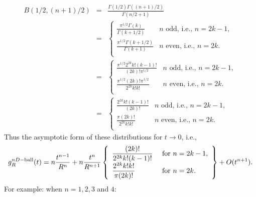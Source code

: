 \begin{eqnarray}
  \label{eq:beta_specified_vals}
  B(1/2,(n+1)/2) & = & \frac{\Gamma(1/2) \Gamma((n+1)/2)}{\Gamma(n/2 + 1)} \nonumber \\
  & = & \left\{ \begin{array}{ll}
      \displaystyle \frac{\pi^{1/2} \Gamma(k)}{\Gamma(k+1/2)} & n \mbox{ odd, i.e., } n=2k-1,\\
      \displaystyle \frac{\pi^{1/2} \Gamma(k+ 1/2)}{\Gamma(k + 1)} & n \mbox{ even, i.e., } n=2k.\\
    \end{array} \right. \nonumber \\
  & = & \left\{ \begin{array}{ll}
      \displaystyle \frac{\pi^{1/2} 2^{2k} k! (k-1)!}{(2k)! \pi^{1/2}} & n \mbox{ odd, i.e., } n=2k-1,\\
      \displaystyle \frac{\pi^{1/2} (2k)! \pi^{1/2}}{2^{2k} k! k!} & n \mbox{ even, i.e., } n=2k.\\
    \end{array} \right. \nonumber \\
  & = & \left\{ \begin{array}{ll}
      \displaystyle \frac{2^{2k} k! (k-1)!}{(2k)! } & n \mbox{ odd, i.e., } n=2k-1,\\
      \displaystyle \frac{\pi (2k)!}{2^{2k} k! k!} & n \mbox{ even, i.e., } n=2k.\\
    \end{array} \right.
\end{eqnarray}
Thus the asymptotic form of these distributions for $t
\rightarrow 0$, i.e., 
\begin{equation}
  \label{eq:asympt_line_picking}
  g^{nD-{\rm ball}}_R(t) = n \frac{t^{n-1}}{R^n} + 
    n \frac{t^{n}}{R^{n+1}} 
   \left\{ \begin{array}{ll}
      \displaystyle 
           \frac{(2k)! }{2^{2k} k! (k-1)!} & \mbox{ for } n=2k-1,\\
      \displaystyle 
           \frac{2^{2k} k! k!}{\pi (2k)!} & \mbox{ for } n=2k.\\
    \end{array} \right\}
 +  O(t^{n+1}).
\end{equation}
For example: when $n=1,2,3$ and $4$:
